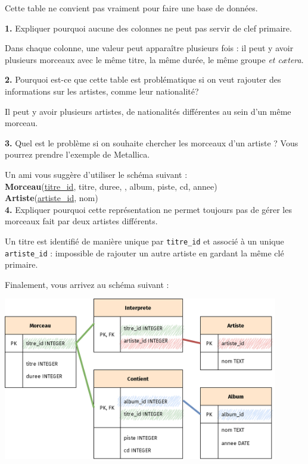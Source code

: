 \documentclass[a4paper,10pt,french]{book}
\begin{document}
Cette table ne convient pas vraiment pour faire une base de données.

\textbf{1.} Expliquer pourquoi aucune des colonnes ne peut pas servir de clef primaire.
\begin{encadre}[Réponse]
    Dans chaque colonne, une valeur peut apparaître plusieurs fois : il peut y avoir plusieurs morceaux avec le même titre, la même durée, le même groupe \textit{et c\ae tera}.
\end{encadre}

\textbf{2.} Pourquoi est-ce que cette table est problématique si on veut rajouter des informations sur les artistes, comme leur nationalité?
\begin{encadre}[Réponse]
    Il peut y avoir plusieurs artistes, de nationalités différentes au sein d'un même morceau.
\end{encadre}

\textbf{3.} Quel est le problème si on souhaite chercher les morceaux d’un artiste ? Vous pourrez prendre l’exemple de Metallica.	
    
    Un ami vous suggère d'utiliser le schéma suivant :\\
    
    \textbf{Morceau}(\uline{titre\_id}, titre, duree, , album, piste, cd, annee)\\
    \textbf{Artiste}(\uline{artiste\_id}, nom)\\
    
    \textbf{4.}	Expliquer pourquoi cette représentation ne permet toujours pas de gérer les morceaux fait par deux artistes différents.	
    
    \begin{encadre}[Réponse]
        Un titre est identifié de manière unique par \texttt{titre\_id} et associé à un unique \texttt{artiste\_id} : impossible de rajouter un autre artiste en gardant la même clé primaire.
    \end{encadre}
    Finalement, vous arrivez au schéma suivant :
    \begin{center}
        \includegraphics[width=12cm]{img/schema}
    \end{center}
    
\end{document}
